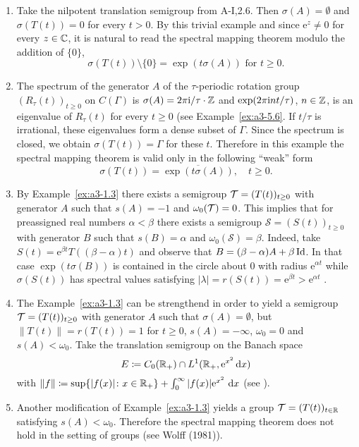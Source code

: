 \begin{example}\label{ex:a3-6.1}%
\begin{enumerate}[\upshape (i), wide, labelindent=.5em]

\item
Take the nilpotent translation semigroup from A-I,2.6. Then $\sigma(A) = \emptyset$ and $\sigma(T(t)) = 0$ for every $t > 0$.
By this trivial example and since $\mathrm{e}^{z} \neq 0$ for every $z \in \mathbb{C}$, it is natural to read the spectral mapping theorem modulo the addition of $\{0\}$, \ie 
\[
\sigma(T(t)) \setminus \{0\} = \exp(t\sigma(A))  \text{ for } t \geq 0 .
\]

\item
The spectrum of the generator $A$ of the $\tau$-periodic rotation group $(R_{\tau}(t))_{t \geq 0}$ on $C(\Gamma)$ is $\sigma(A) = 2\pi\mathrm{i} /\tau\cdot\mathbb{Z}$ and $\exp(2\pi\mathrm{i} nt/\tau)$, $n \in \mathbb{Z}$, is an eigenvalue of $R_{\tau}(t)$ for every $t \geq 0$ (see Example~\ref{ex:a3-5.6}.
If $t/\tau$ is irrational, these eigenvalues form a dense subset of $\Gamma$.
Since the spectrum is closed, we obtain $\sigma(T(t)) = \Gamma$ for these $t$.
Therefore in this example the spectral mapping theorem is valid only in the following \enquote{weak} form
\[
\sigma(T(t)) = \overline{\exp(t\sigma(A))}, \quad t \geq 0 .
\]

\item 
By Example~\ref{ex:a3-1.3} there exists a semigroup $\mathcal{T} = (T(t))_{t \geq 0}$ with generator $A$ such that $s(A) = -1$ and $\omega_{0}(\mathcal{T}) = 0$.
This implies that for preassigned real numbers $\alpha < \beta$ there exists a semigroup $\mathcal{S} = (S(t))_{t \geq 0}$ with generator $B$ such that $s(B) = \alpha$ and $\omega_{0}(\mathcal{S}) = \beta$. Indeed, take $S(t) = \mathrm{e}^{\beta t}T((\beta - \alpha)t)$ and observe that $B = (\beta-\alpha)A + \beta\operatorname{Id}$. 
In that case $\exp(t\sigma(B))$ is contained in the circle about $0$ with radius $\mathrm{e}^{\alpha t}$ 
while $\sigma(S(t))$ has spectral values satisfying $|\lambda| = r(S(t)) = \mathrm{e}^{\beta t} > \mathrm{e}^{\alpha t}$ .


\item 
The Example~\ref{ex:a3-1.3} can be strengthend in order to yield a semigroup $\mathcal{T} = (T(t))_{t \geq 0}$ with generator $A$ such that $\sigma(A) = \emptyset$, but $\|T(t)\| = r(T(t)) = 1$ for $t \geq 0$, \ie $s(A) = -\infty$, $\omega_{0} = 0$ and $s(A) < \omega_{0}$. 
Take the translation semigroup on the Banach space
\[
E \coloneqq C_{0}(\mathbb{R}_{+}) \cap L^{1}(\mathbb{R}_{+}, \mathrm{e}^{x^{2}}\mathop{}\!\mathrm{d}{x})
\]
with $\|f\| \coloneqq \sup \{|f(x)| \colon x \in \mathbb{R}_{+}\} + \int_{0}^{\infty} |f(x)|\mathrm{e}^{x^{2}} \, \mathop{}\!\mathrm{d}{x}$ (see \citet{greinervoigtwolff:1981}).

\item 
Another modification of Example~\ref{ex:a3-1.3} yields a group $\mathcal{T} = (T(t))_{t \in \mathbb{R}}$ satisfying $s(A) < \omega_{0}$.
Therefore the spectral mapping theorem does not hold in the setting of groups (see Wolff (1981)).
\end{enumerate}
\end{example}

